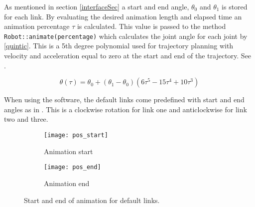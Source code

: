 As mentioned in section \ref{interfaceSec} a start and end angle, $\theta_0$ and $\theta_1$ is stored for each link. By evaluating the desired animation length and elapsed time an animation percentage $\tau$ is calculated. This value is passed to the method \texttt{Robot::animate(percentage)} which calculates the joint angle for each joint by \eqref{quintic}. This is a 5th degree polynomial used for trajectory planning with velocity and acceleration equal to zero at the start and end of the trajectory. See .

\begin{equation}\label{quintic}
\theta\left ( \tau \right ) = \theta_0 + \left ( \theta_1 - \theta_0\right )\left ( 6 \tau^5-15\tau^4 + 10\tau^3\right )
\end{equation}

When using the software, the \textsf{default links} come predefined with start and end angles as in . This is a clockwise rotation for link one and anticlockwise for link two and three.

\begin{figure}[ht!]
\begin{subfigure}[b]{0.32\textwidth}
    \centering
    \texttt{[image: pos\_start]}
    \caption{Animation start}
\end{subfigure}
\hfill
\begin{subfigure}[b]{0.4\textwidth}
    \centering
    \texttt{[image: pos\_end]}
    \caption{Animation end}
\end{subfigure}
\caption{Start and end of animation for default links.}
\label{animation}
\end{figure}
